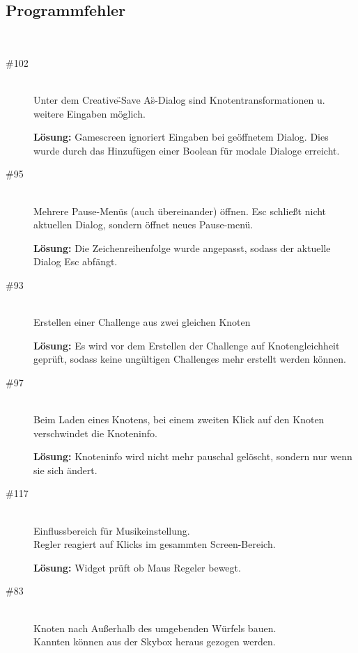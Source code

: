 %



\subsection*{Programmfehler}


~\\
\begin{description}
\item[\#102] \hfill \\
Unter dem Creative-\"{}Save As\"{}-Dialog sind Knotentransformationen u. weitere Eingaben möglich.

{\bfseries Lösung:} Gamescreen ignoriert Eingaben bei geöffnetem Dialog. Dies wurde durch das Hinzufügen einer Boolean für modale Dialoge erreicht. 

\item[\#95] \hfill \\
Mehrere Pause-Menüs (auch übereinander) öffnen.
Esc schließt nicht aktuellen Dialog, sondern öffnet neues Pause-menü.

{\bfseries Lösung:} Die Zeichenreihenfolge wurde angepasst, sodass der aktuelle Dialog Esc abfängt.

\item[\#93] \hfill \\
Erstellen einer Challenge aus zwei gleichen Knoten

{\bfseries Lösung:}  Es wird vor dem Erstellen der Challenge auf Knotengleichheit geprüft, sodass keine ungültigen Challenges mehr erstellt werden können.

\item[\#97] \hfill \\
Beim Laden eines Knotens, bei einem zweiten Klick auf den Knoten verschwindet die Knoteninfo.

{\bfseries Lösung:} Knoteninfo wird nicht mehr pauschal gelöscht, sondern nur wenn sie sich ändert. 



\item[\#117] \hfill \\
Einflussbereich für Musikeinstellung. \\
Regler reagiert auf Klicks im gesammten Screen-Bereich.

{\bfseries Lösung:} Widget prüft ob Maus Regeler bewegt.

\item[\#83] \hfill \\
Knoten nach Außerhalb des umgebenden Würfels bauen. \\
Kannten können aus der Skybox heraus gezogen werden.


\end{description}
